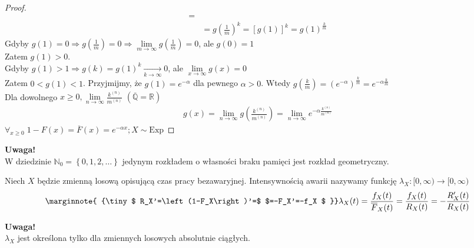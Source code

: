 \begin{twr}
\begin{proof}
\begin{align*}
=\\&=
g\left(\tfrac{1}{m}\right)^k
=
\left[g\left(1\right)\right]^k
=
g\left(1\right)^\frac{k}{m}
\end{align*}
Gdyby $ g(1)=0\Rightarrow g\left(\frac{1}{m}\right)=0\Rightarrow\lim\limits_{m\to\infty}g\left(\frac{1}{m}\right) =0 $, ale $ g(0)=1 $\\
Zatem $ g(1)>0 $.\\
Gdyby $ g(1)>1 \Rightarrow g(k)=g(1)^k\xrightarrow[k\to\infty]{} 0$, ale $ \lim\limits_{x\to\infty} g(x)=0 $\\
Zatem $ 0<g(1) <1$. Przyjmijmy, że $ g(1)=e^{-\alpha} $ dla pewnego $ \alpha>0 $. Wtedy $ g\left(\frac{k}{m}\right) =\left(e^{-\alpha}\right)^\frac{k}{m}=e^{-\alpha\frac{k}{m}}$\\
Dla dowolnego $ x\ge0,\lim\limits_{n\to\infty}\frac{k^{(n)}}{m^{(n)}}  $  $ \left(\overline{\mathbb Q}=\mathbb R \right) $
\begin{gather*}
g(x)=\lim\limits_{n\to\infty }g\left(\frac{k^{(n)}}{m^{(n)}} \right) 
=
\lim\limits_{n\to \infty } e^{-\alpha\frac{k^{(n)}}{m^{(n)}}}
\end{gather*}
$ \forall_{x\ge 0}\; 1-F(x)=\overline{F}(x)=e^{-\alpha x};X\sim \text{Exp} $
\end{proof}
\end{twr}

\textbf{Uwaga!}\\
W dziedzinie $ \mathbb N _0=\left\{0,1,2,\dots \right\} $ jedynym rozkładem o własności braku pamięci jest rozkład geometryczny.
\begin{defi}
Niech $ X $ będzie zmienną losową opisującą czas pracy bezawaryjnej. Intensywnością awarii nazywamy funkcję $ \lambda_X:[0,\infty )\to [0,\infty )$
\begin{gather*}
\marginnote{
{\tiny $ R_X'=\left(1-F_X\right)'=$  $=-F_X'=-f_X $
}}
\lambda_X(t)
=
\frac{f_X(t)}{\overline{F}_X(t)}
=
\frac{f_X(t)}{R_X(t)}
=
-\frac{R_X'(t)}{R_X(t)}
\end{gather*}
\end{defi}

\textbf{Uwaga!}\\
$ \lambda_X $ jest określona tylko dla zmiennych losowych absolutnie ciągłych.

